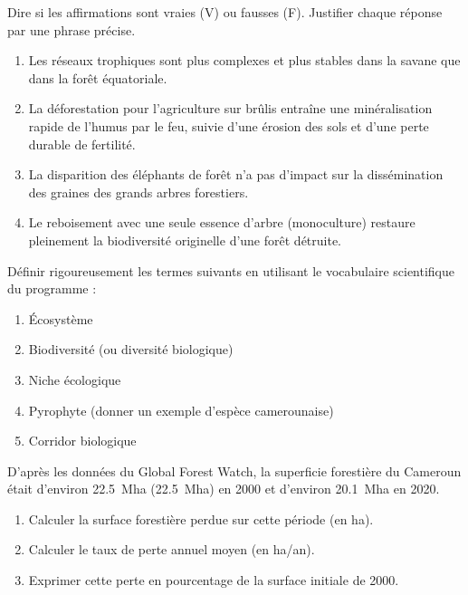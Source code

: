 \documentclass[11pt]{article}
\newcommand{\cle}[1]{{\popxbold\color{popdark}#1}}
\begin{document}
\begin{exercice}
Dire si les affirmations sont vraies (V) ou fausses (F). Justifier chaque réponse par une phrase précise.
\begin{enumerate}
    \item Les réseaux trophiques sont plus complexes et plus stables dans la savane que dans la forêt équatoriale.
    \item La déforestation pour l'agriculture sur brûlis entraîne une minéralisation rapide de l'humus par le feu, suivie d'une érosion des sols et d'une perte durable de fertilité.
    \item La disparition des éléphants de forêt n'a pas d'impact sur la dissémination des graines des grands arbres forestiers.
    \item Le reboisement avec une seule essence d'arbre (monoculture) restaure pleinement la biodiversité originelle d'une forêt détruite.
\end{enumerate}
\end{exercice}

\begin{exercice}
Définir rigoureusement les termes suivants en utilisant le vocabulaire scientifique du programme :
\begin{enumerate}
    \item \cle{Écosystème}
    \item \cle{Biodiversité} (ou diversité biologique)
    \item \cle{Niche écologique}
    \item \cle{Pyrophyte} (donner un exemple d'espèce camerounaise)
    \item \cle{Corridor biologique}
\end{enumerate}
\end{exercice}

\begin{exercice}
D'après les données du Global Forest Watch, la superficie forestière du Cameroun était d'environ \SI{22,5}{Mha} (\SI{22,5}{\mega\hectare}) en 2000 et d'environ \SI{20,1}{Mha} en 2020.
\begin{enumerate}
    \item Calculer la surface forestière perdue sur cette période (en \si{\hectare}).
    \item Calculer le taux de perte annuel moyen (en \si{\hectare/an}).
    \item Exprimer cette perte en pourcentage de la surface initiale de 2000.
\end{enumerate}
\end{exercice}
\end{document}
